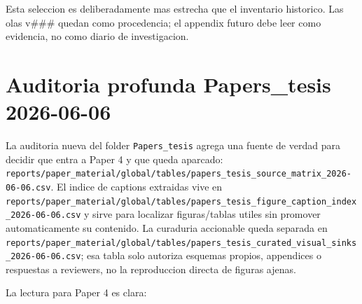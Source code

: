 \documentclass[
  spanish,
  11pt,
  letterpaper,
]{scrbook}
\theoremstyle{plain}
\theoremstyle{remark}
\begin{document}
Esta seleccion es deliberadamente mas estrecha que el inventario
historico. Las olas v\#\#\# quedan como procedencia; el appendix futuro
debe leer como evidencia, no como diario de investigacion.

\section{Auditoria profunda Papers\_tesis
2026-06-06}\label{auditoria-profunda-papers_tesis-2026-06-06}

La auditoria nueva del folder \texttt{Papers\_tesis} agrega una fuente
de verdad para decidir que entra a Paper 4 y que queda aparcado:
\texttt{reports/paper\_material/global/tables/papers\_tesis\_source\_matrix\_2026-06-06.csv}.
El indice de captions extraidas vive en
\texttt{reports/paper\_material/global/tables/papers\_tesis\_figure\_caption\_index\_2026-06-06.csv}
y sirve para localizar figuras/tablas utiles sin promover
automaticamente su contenido. La curaduria accionable queda separada en
\texttt{reports/paper\_material/global/tables/papers\_tesis\_curated\_visual\_sinks\_2026-06-06.csv};
esa tabla solo autoriza esquemas propios, appendices o respuestas a
reviewers, no la reproduccion directa de figuras ajenas.

La lectura para Paper 4 es clara:
\end{document}
